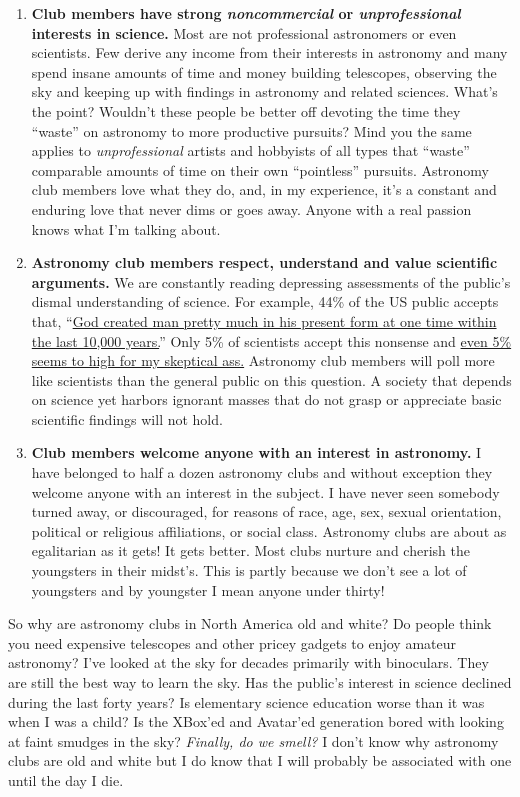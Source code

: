 \begin{enumerate}
\item
  \textbf{Club members have strong \emph{noncommercial} or
  \emph{unprofessional} interests in science.} Most are not professional
  astronomers or even scientists. Few derive any income from their
  interests in astronomy and many spend insane amounts of time and money
  building telescopes, observing the sky and keeping up with findings in
  astronomy and related sciences. What's the point? Wouldn't these
  people be better off devoting the time they ``waste'' on astronomy to
  more productive pursuits? Mind you the same applies to
  \emph{unprofessional} artists and hobbyists of all types that
  ``waste'' comparable amounts of time on their own ``pointless''
  pursuits. Astronomy club members love what they do, and, in my
  experience, it's a constant and enduring love that never dims or goes
  away. Anyone with a real passion knows what I'm talking about.
\item
  \textbf{Astronomy club members respect, understand and value
  scientific arguments.} We are constantly reading depressing assessments
  of the public's dismal understanding of science. For example, 44\% of
  the US public accepts that,
  ``\href{http://www.religioustolerance.org/ev\_publia.htm}{God created
  man pretty much in his present form at one time within the last 10,000
  years.}'' Only 5\% of scientists accept this nonsense and
  \href{http://bakerjd99.wordpress.com/2009/10/29/hard-ass-skeptic-rules/}{even
  5\% seems to high for my skeptical ass.} Astronomy club members will
  poll more like scientists than the general public on this question. A
  society that depends on science yet harbors ignorant masses that do
  not grasp or appreciate basic scientific findings will not hold.
\item
  \textbf{Club members welcome anyone with an interest in astronomy.} I
  have belonged to half a dozen astronomy clubs and without exception
  they welcome anyone with an interest in the subject. I have never seen
  somebody turned away, or discouraged, for reasons of race, age, sex,
  sexual orientation, political or religious affiliations, or social
  class. Astronomy clubs are about as egalitarian as it gets! It gets
  better. Most clubs nurture and cherish the youngsters in their
  midst's. This is partly because we don't see a lot of youngsters and
  by youngster I mean anyone under thirty!
\end{enumerate}
So why are astronomy clubs in North America old and white? Do people
think you need expensive telescopes and other pricey gadgets to enjoy
amateur astronomy? I've looked at the sky for decades primarily with
binoculars. They are still the best way to learn the sky. Has the
public's interest in science declined during the last forty years? Is
elementary science education worse than it was when I was a child? Is
the XBox'ed and Avatar'ed generation bored with looking at faint smudges
in the sky? \emph{Finally, do we smell?} I don't know why astronomy
clubs are old and white but I do know that I will probably be associated
with one until the day I die.

